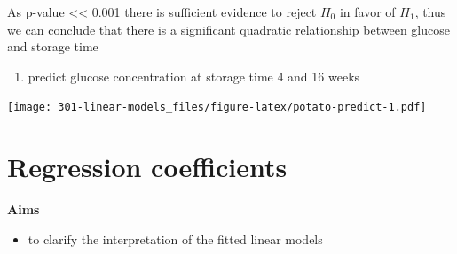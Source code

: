 \documentclass[
]{book}
\newenvironment{Shaded}{\begin{snugshade}}{\end{snugshade}}
\newcommand{\DataTypeTok}[1]{\textcolor[rgb]{0.13,0.29,0.53}{#1}}
\newcommand{\DecValTok}[1]{\textcolor[rgb]{0.00,0.00,0.81}{#1}}
\newcommand{\KeywordTok}[1]{\textcolor[rgb]{0.13,0.29,0.53}{\textbf{#1}}}
\newcommand{\NormalTok}[1]{#1}
\newcommand{\OperatorTok}[1]{\textcolor[rgb]{0.81,0.36,0.00}{\textbf{#1}}}
\newcommand{\StringTok}[1]{\textcolor[rgb]{0.31,0.60,0.02}{#1}}
\providecommand{\tightlist}{%
  \setlength{\itemsep}{0pt}\setlength{\parskip}{0pt}}
\theoremstyle{definition}
\theoremstyle{definition}
\theoremstyle{definition}
\theoremstyle{remark}
\begin{document}
As p-value \textless\textless{} 0.001 there is sufficient evidence to reject \(H_0\) in favor of \(H_1\), thus we can conclude that there is a significant quadratic relationship between glucose and storage time

\begin{enumerate}
\def\labelenumi{\alph{enumi})}
\setcounter{enumi}{4}
\tightlist
\item
  predict glucose concentration at storage time 4 and 16 weeks
\end{enumerate}

\begin{Shaded}
\end{Shaded}

\texttt{[image: 301-linear-models\_files/figure-latex/potato-predict-1.pdf]}

\hypertarget{regression-coefficients}{%
\chapter{Regression coefficients}\label{regression-coefficients}}

\textbf{Aims}

\begin{itemize}
\tightlist
\item
  to clarify the interpretation of the fitted linear models
\end{itemize}
\end{document}
